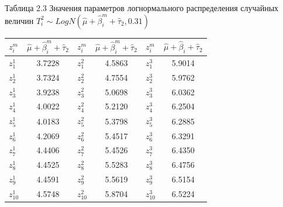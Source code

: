 \documentclass[14pt, a4paper]{extarticle}
\numberwithin{equation}{section}
\begin{document}
{\begin{table}[h!]
\centering
\begin{flushright}
Таблица 2.3 Значения параметров логнормального распределения случайных величин $T_i^2 \sim LogN(\hat{\mu}+\hat{\beta}_i^m+\hat{\tau}_2,0.31)$
\end{flushright}
\begin{tabular}{|>{\centering}m{60pt}|c|>{\centering}m{60pt}|c|>{\centering}m{60pt}|c|}
\hline
$z_i^m$ 	&$\hat{\mu}+\hat{\beta}_i^m+\hat{\tau}_2$ & $z_i^m$	& $\hat{\mu}+\hat{\beta}_i^m+\hat{\tau}_2$ & $z_i^m$ & $\hat{\mu}+\hat{\beta}_i+\hat{\tau}_2$ \\ \hline	
$z_1^1$		& 3.7228	& $z_1^2$	& 4.5863	& $z_1^3$	& 5.9014 \\ \hline
$z_2^1$		& 3.7324	& $z_2^2$	& 4.7554	& $z_2^3$	& 5.9762 \\ \hline
$z_3^1$		& 3.9238	& $z_3^2$	& 5.0698	& $z_3^3$	& 6.0362 \\ \hline
$z_4^1$		& 4.0022	& $z_4^2$	& 5.2120	& $z_4^3$	& 6.2504 \\ \hline
$z_5^1$		& 4.0183	& $z_5^2$	& 5.3798	& $z_5^3$	& 6.2885 \\ \hline
$z_6^1$		& 4.2069	& $z_6^2$	& 5.4517	& $z_6^3$	& 6.3291 \\ \hline
$z_7^1$		& 4.4406	& $z_7^2$	& 5.4526	& $z_7^3$	& 6.4350 \\ \hline
$z_8^1$		& 4.4525	& $z_8^2$	& 5.5283	& $z_8^3$	& 6.4756 \\ \hline
$z_9^1$		& 4.4591	& $z_9^2$	& 5.5619	& $z_9^3$	& 6.5154 \\ \hline
$z_{10}^1$	& 4.5748	& $z_{10}^2$& 5.8704	& $z_{10}^3$& 6.5224 \\ \hline
\end{tabular}
\label{ch2}
\end{table}

}
\end{document}
